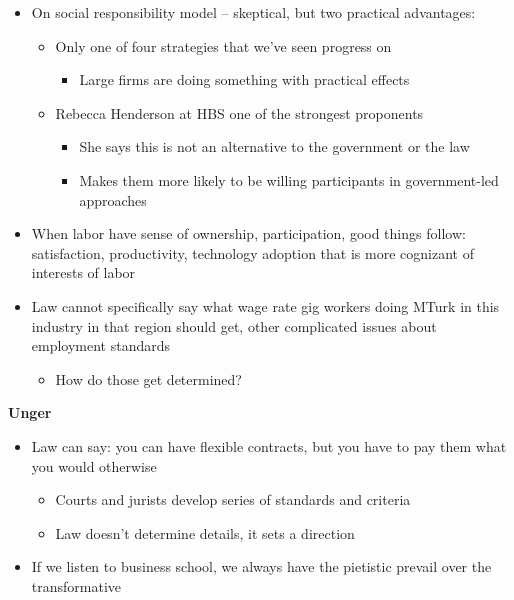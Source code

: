 \begin{itemize}
\tightlist
\item
  On social responsibility model -- skeptical, but two practical
  advantages:

  \begin{itemize}
  \tightlist
  \item
    Only one of four strategies that we've seen progress on

    \begin{itemize}
    \tightlist
    \item
      Large firms are doing something with practical effects
    \end{itemize}
  \item
    Rebecca Henderson at HBS one of the strongest proponents

    \begin{itemize}
    \tightlist
    \item
      She says this is not an alternative to the government or the law
    \item
      Makes them more likely to be willing participants in
      government-led approaches
    \end{itemize}
  \end{itemize}
\item
  When labor have sense of ownership, participation, good things follow:
  satisfaction, productivity, technology adoption that is more cognizant
  of interests of labor
\item
  Law cannot specifically say what wage rate gig workers doing MTurk in
  this industry in that region should get, other complicated issues
  about employment standards

  \begin{itemize}
  \tightlist
  \item
    How do those get determined?
  \end{itemize}
\end{itemize}

\textbf{Unger}

\begin{itemize}
\tightlist
\item
  Law can say: you can have flexible contracts, but you have to pay them
  what you would otherwise

  \begin{itemize}
  \tightlist
  \item
    Courts and jurists develop series of standards and criteria
  \item
    Law doesn't determine details, it sets a direction
  \end{itemize}
\item
  If we listen to business school, we always have the pietistic prevail
  over the transformative
\end{itemize}

